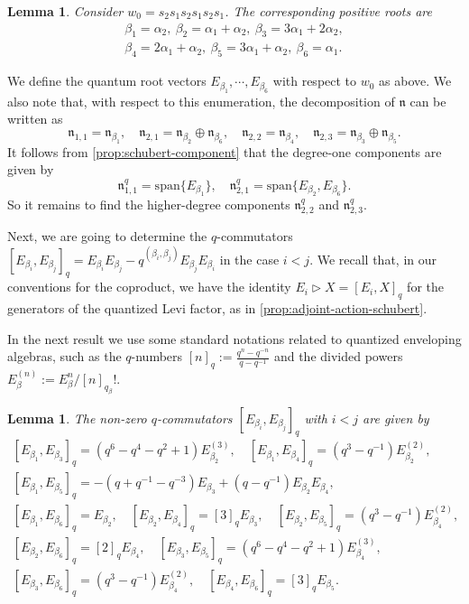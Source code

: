 \documentclass[a4paper, 12pt, reqno, english]{amsart}
\numberwithin{equation}{section}
\numberwithin{figure}{section}
\theoremstyle{plain}
\theoremstyle{plain}
\theoremstyle{plain}
\theoremstyle{plain}
\newtheorem{lemma}[theorem]{Lemma}
\theoremstyle{plain}
\theoremstyle{definition}
\theoremstyle{definition}
\theoremstyle{definition}
\theoremstyle{remark}
\theoremstyle{definition}
\theoremstyle{definition}
\newcommand{\lien}{\mathfrak{n}}
\newcommand{\lspan}{\mathrm{span}}
\newcommand{\qnil}{\lien^q}
\begin{document}
\begin{lemma}
Consider $w_0 = s_2 s_1 s_2 s_1 s_2 s_1$. The corresponding positive roots are
\[
\begin{gathered}
\beta_1 = \alpha_2, \
\beta_2 = \alpha_1 + \alpha_2, \
\beta_3 = 3 \alpha_1 + 2 \alpha_2, \\
\beta_4 = 2 \alpha_1 + \alpha_2, \ 
\beta_5 = 3 \alpha_1 + \alpha_2, \
\beta_6 = \alpha_1.
\end{gathered}
\]
\end{lemma}

We define the quantum root vectors $E_{\beta_1}, \cdots, E_{\beta_6}$ with respect to $w_0$ as above.
We also note that, with respect to this enumeration, the decomposition of $\lien$ can be written as
\[
\lien_{1, 1} = \lien_{\beta_1}, \quad
\lien_{2, 1} = \lien_{\beta_2} \oplus \lien_{\beta_6}, \quad
\lien_{2, 2} = \lien_{\beta_4}, \quad
\lien_{2, 3} = \lien_{\beta_3} \oplus \lien_{\beta_5}.
\]
It follows from \cref{prop:schubert-component} that the degree-one components are given by
\[
\qnil_{1, 1} = \lspan \{ E_{\beta_1} \}, \quad
\qnil_{2, 1} = \lspan \{ E_{\beta_2}, E_{\beta_6} \}.
\]
So it remains to find the higher-degree components $\qnil_{2, 2}$ and $\qnil_{2, 3}$.

Next, we are going to determine the $q$-commutators $[E_{\beta_i}, E_{\beta_j}]_q = E_{\beta_i} E_{\beta_j} - q^{(\beta_i, \beta_j)} E_{\beta_j} E_{\beta_i}$ in the case $i < j$.
We recall that, in our conventions for the coproduct, we have the identity $E_i \triangleright X = [E_i, X]_q$ for the generators of the quantized Levi factor, as in \cref{prop:adjoint-action-schubert}.

In the next result we use some standard notations related to quantized enveloping algebras, such as the $q$-numbers $[n]_q := \frac{q^n - q^{-n}}{q - q^{-1}}$ and the divided powers $E_\beta^{(n)} := E_\beta^n / [n]_{q_\beta}!$.

\begin{lemma}
\label{lem:G2-qcommutators}
The non-zero $q$-commutators $[E_{\beta_i}, E_{\beta_j}]_q$ with $i < j$ are given by
\[
\begin{gathered}
[E_{\beta_1}, E_{\beta_3}]_q = (q^6 - q^4 - q^2 + 1) E_{\beta_2}^{(3)}, \quad
[E_{\beta_1}, E_{\beta_4}]_q = (q^3 - q^{-1}) E_{\beta_2}^{(2)}, \\
[E_{\beta_1}, E_{\beta_5}]_q = - (q + q^{-1}- q^{-3}) E_{\beta_3} + (q - q^{-1}) E_{\beta_2} E_{\beta_4}, \\
[E_{\beta_1}, E_{\beta_6}]_q = E_{\beta_2}, \quad
[E_{\beta_2}, E_{\beta_4}]_q = [3]_q E_{\beta_3}, \quad
[E_{\beta_2}, E_{\beta_5}]_q = (q^3 - q^{-1}) E_{\beta_4}^{(2)}, \\
[E_{\beta_2}, E_{\beta_6}]_q = [2]_q E_{\beta_4}, \quad
[E_{\beta_3}, E_{\beta_5}]_q = (q^6 - q^4 - q^2 + 1) E_{\beta_4}^{(3)}, \\
[E_{\beta_3}, E_{\beta_6}]_q = (q^3 - q^{-1}) E_{\beta_4}^{(2)}, \quad
[E_{\beta_4}, E_{\beta_6}]_q = [3]_q E_{\beta_5}.
\end{gathered}
\]
\end{lemma}
\end{document}
